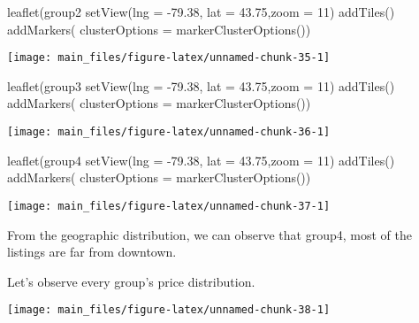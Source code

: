 \begin{Schunk}
\begin{Sinput}
leaflet(group2 %>% select(longitude,latitude)) %>%
  setView(lng = -79.38, lat = 43.75,zoom = 11) %>%
   addTiles() %>% 
  addMarkers(
  clusterOptions = markerClusterOptions())
\end{Sinput}


\begin{center}\texttt{[image: main\_files/figure-latex/unnamed-chunk-35-1]} \end{center}

\end{Schunk}

\begin{Schunk}
\begin{Sinput}
leaflet(group3 %>% select(longitude,latitude)) %>%
  setView(lng = -79.38, lat = 43.75,zoom = 11) %>%
   addTiles() %>% 
  addMarkers(
  clusterOptions = markerClusterOptions())
\end{Sinput}


\begin{center}\texttt{[image: main\_files/figure-latex/unnamed-chunk-36-1]} \end{center}

\end{Schunk}

\begin{Schunk}
\begin{Sinput}
leaflet(group4 %>% select(longitude,latitude)) %>%
  setView(lng = -79.38, lat = 43.75,zoom = 11) %>%
   addTiles() %>% 
  addMarkers(
  clusterOptions = markerClusterOptions())
\end{Sinput}


\begin{center}\texttt{[image: main\_files/figure-latex/unnamed-chunk-37-1]} \end{center}

\end{Schunk}

From the geographic distribution, we can observe that group4, most of
the listings are far from downtown.

Let's observe every group's price distribution.

\begin{Schunk}


\begin{center}\texttt{[image: main\_files/figure-latex/unnamed-chunk-38-1]} \end{center}

\end{Schunk}

